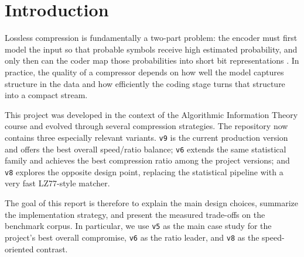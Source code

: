 \section{Introduction}
\label{sec:introduction}

Lossless compression is fundamentally a two-part problem: the encoder must first model the input so that probable symbols receive high estimated probability, and only then can the coder map those probabilities into short bit representations \cite{shannon1948}. In practice, the quality of a compressor depends on how well the model captures structure in the data and how efficiently the coding stage turns that structure into a compact stream.

This project was developed in the context of the Algorithmic Information Theory course and evolved through several compression strategies. The repository now contains three especially relevant variants. \texttt{v9} is the current production version and offers the best overall speed/ratio balance; \texttt{v6} extends the same statistical family and achieves the best compression ratio among the project versions; and \texttt{v8} explores the opposite design point, replacing the statistical pipeline with a very fast LZ77-style matcher.

The goal of this report is therefore to explain the main design choices, summarize the implementation strategy, and present the measured trade-offs on the benchmark corpus. In particular, we use \texttt{v5} as the main case study for the project's best overall compromise, \texttt{v6} as the ratio leader, and \texttt{v8} as the speed-oriented contrast.
